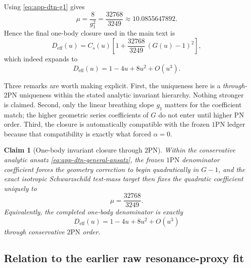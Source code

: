 \documentclass[11pt]{article}
\newcommand{\OnePN}{\mathrm{1PN}}
\newcommand{\TwoPN}{\mathrm{2PN}}
\newtheorem{claim}{Claim}
\begin{document}
Using \cref{eq:app-dtn-g1} gives
\begin{equation}
\mu=\frac{8}{g_1^2}=\frac{32768}{3249}\approx 10.0855647892.
\label{eq:app-dtn-mu-value}
\end{equation}
Hence the final one-body closure used in the main text is
\begin{equation}
D_{\mathrm{eff}}(u)
=C_s(u)\left[1+\frac{32768}{3249}\,(G(u)-1)^2\right],
\label{eq:app-dtn-final-closure}
\end{equation}
which indeed expands to
\begin{equation}
D_{\mathrm{eff}}(u)=1-4u+8u^2+O(u^3).
\label{eq:app-dtn-final-series}
\end{equation}

Three remarks are worth making explicit.
First, the uniqueness here is a \emph{through-\(\TwoPN\)} uniqueness within the stated
analytic invariant hierarchy.  Nothing stronger is claimed.
Second, only the linear breathing slope \(g_1\) matters for the coefficient match;
the higher geometric series coefficients of \(G\) do not enter until higher PN order.
Third, the closure is automatically compatible with the frozen \(\OnePN\) ledger because
that compatibility is exactly what forced \(\alpha=0\).

\begin{claim}[One-body invariant closure through \texorpdfstring{$2$}{2}PN]
\label{clm:app-dtn-one-body-closure}
Within the conservative analytic ansatz \cref{eq:app-dtn-general-ansatz}, the frozen
\(\OnePN\) denominator coefficient forces the geometry correction to begin quadratically
in \(G-1\), and the exact isotropic Schwarzschild test-mass target then fixes the
quadratic coefficient uniquely to
\begin{equation}
\mu=\frac{32768}{3249}.
\label{eq:app-dtn-claim-mu}
\end{equation}
Equivalently, the completed one-body denominator is exactly
\begin{equation}
D_{\mathrm{eff}}(u)=1-4u+8u^2+O(u^3)
\label{eq:app-dtn-claim-target}
\end{equation}
through conservative \(\TwoPN\) order.
\end{claim}

\subsection{Relation to the earlier raw resonance-proxy fit}
\label{app:one-body-dtn-raw-proxy}
\end{document}

